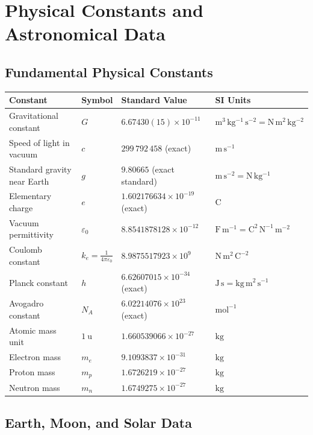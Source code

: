 \chapter{Physical Constants and Astronomical Data}
\label{app:constants}

\section{Fundamental Physical Constants}

\begin{center}
\renewcommand{\arraystretch}{1.3}
\begin{tabular}{@{}llll@{}}
\toprule
\textbf{Constant} & \textbf{Symbol} & \textbf{Standard Value} & \textbf{SI Units} \\
\midrule
Gravitational constant & $G$ & $6.67430(15)\times 10^{-11}$ & $\mathrm{m^3\,kg^{-1}\,s^{-2}} = \mathrm{N\,m^2\,kg^{-2}}$ \\
Speed of light in vacuum & $c$ & $299\,792\,458$ (exact) & $\mathrm{m\,s^{-1}}$ \\
Standard gravity near Earth & $g$ & $9.80665$ (exact standard) & $\mathrm{m\,s^{-2}} = \mathrm{N\,kg^{-1}}$ \\
Elementary charge & $e$ & $1.602176634\times 10^{-19}$ (exact) & $\mathrm{C}$ \\
Vacuum permittivity & $\varepsilon_0$ & $8.8541878128\times 10^{-12}$ & $\mathrm{F\,m^{-1}} = \mathrm{C^2\,N^{-1}\,m^{-2}}$ \\
Coulomb constant & $k_e = \frac{1}{4\pi\varepsilon_0}$ & $8.9875517923\times 10^9$ & $\mathrm{N\,m^2\,C^{-2}}$ \\
Planck constant & $h$ & $6.62607015\times 10^{-34}$ (exact) & $\mathrm{J\,s} = \mathrm{kg\,m^2\,s^{-1}}$ \\
Avogadro constant & $N_A$ & $6.02214076\times 10^{23}$ (exact) & $\mathrm{mol^{-1}}$ \\
Atomic mass unit & $1\ \mathrm{u}$ & $1.660539066\times 10^{-27}$ & $\mathrm{kg}$ \\
Electron mass & $m_e$ & $9.1093837\times 10^{-31}$ & $\mathrm{kg}$ \\
Proton mass & $m_p$ & $1.6726219\times 10^{-27}$ & $\mathrm{kg}$ \\
Neutron mass & $m_n$ & $1.6749275\times 10^{-27}$ & $\mathrm{kg}$ \\
\bottomrule
\end{tabular}
\end{center}

\section{Earth, Moon, and Solar Data}

